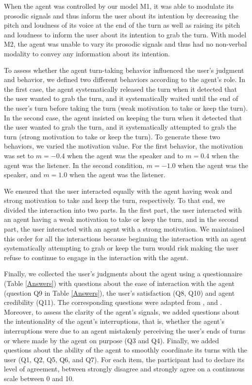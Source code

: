 \documentclass[twocolumn]{svjour3}
\begin{document}
When the agent was controlled by our model M1, it was able to modulate its prosodic signals and thus inform the user about its intention by decreasing the pitch and loudness of its voice at the end of the turn as well as raising its pitch and loudness to inform the user about its intention to grab the turn.  
With model M2, the agent was unable to vary its prosodic signals and thus had no non-verbal modality to convey any information about its intention. 

To assess whether the agent turn-taking behavior influenced the user's judgment and behavior, we defined two different behaviors according to the agent's role. In the first case, the agent systematically released the turn when it detected that the user wanted to grab the turn, and it systematically waited until the end of the user's turn before taking the turn (weak motivation to take or keep the turn). In the second case, the agent insisted on keeping the turn when it detected that the user wanted to grab the turn, and it systematically attempted to grab the turn (strong motivation to take or keep the turn). To generate these two behaviors, we varied the motivation value. 
For the first behavior, the motivation was set to $m=-0.4$ when the agent was the speaker and to $m=0.4$ when the agent was the listener. In the second condition, $m=-1.0$ when the agent was the speaker, and $m=1.0$ when the agent was the listener.

We ensured that the user interacted equally with the agent having  weak and strong motivation to take and keep the turn, respectively. To that end, we divided the interaction into two parts. In the first part, the user interacted with an agent having a weak motivation to take or keep the turn, and in the second part, the user interacted with an agent with a strong motivation.
We maintained this order for all the interactions because beginning the interaction with an agent systematically attempting to grab or keep the turn would risk making the user refuse to continue to engage in the interaction with the agent. 

Finally, we collected the user's judgments about the agent using a questionnaire (Table \ref{Answers}) with questions about the ease of interaction with the agent (question Q9 in Table \ref{Answers}), the user's satisfaction (Q8, Q10) and agent credibility (Q11). The corresponding questions were adapted from \cite{skantze_towards_2010}, \cite{bevacqua_effects_2014} and \cite{de_vault_toward_2015}. Moreover, to assess the clarity of the agent's signals, we added questions about the intentionality of the agent's interruptions, that is, whether the agent's interruptions were due to an agent mistakenly perceiving the user's ends of turns or where made by the agent on purpose (Q3 and Q4). Finally, we added questions about the ability of the agent to smoothly coordinate its turns with the user (Q1, Q2, Q5, Q6, and  Q7). For each item, the participant had to declare its level of agreement, between strongly disagree and strongly agree on a continuous scale between 0 and 10. 
\end{document}
